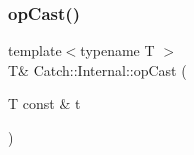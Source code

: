 \mbox{\label{namespace_catch_1_1_internal_adde98c1a650e94615e2b37ab0b3734e2}} 
\subsubsection{op\+Cast()}
{\footnotesize\ttfamily template$<$typename T $>$ \\
T\& Catch\+::\+Internal\+::op\+Cast (\begin{DoxyParamCaption}\item[{T const \&}]{t }\end{DoxyParamCaption})\hspace{0.3cm}{\ttfamily [inline]}}

